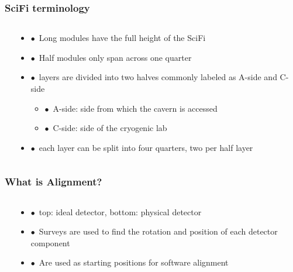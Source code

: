 \documentclass[aspectratio=1610, 12pt]{beamer}
\begin{document}
\begin{frame}\frametitle{SciFi terminology}
  \begin{columns}
    \begin{column}[c]{0.48\textwidth}
      
    \end{column}
    \begin{column}{0.48\textwidth}
      \begin{itemize}
        \item $\bullet$\, Long modules have the full height of the SciFi
        \item $\bullet$\, Half modules only span across one quarter
        \item $\bullet$\, layers are divided into two halves commonly labeled as A-side and C-side
        \begin{itemize}
          \item $\bullet$\, A-side: side from which the cavern is accessed
          \item $\bullet$\, C-side: side of the cryogenic lab
        \end{itemize}
        \item $\bullet$\, each layer can be split into four quarters, two per half layer
      \end{itemize}
    \end{column}
  \end{columns}
\end{frame}

\begin{frame}\frametitle{What is Alignment?}
  \begin{columns}
    \begin{column}[c]{0.48\textwidth}
      
    \end{column}
    \begin{column}[c]{0.48\textwidth}
      \begin{itemize}
        \item $\bullet$\, top: ideal detector, bottom: physical detector
        \item $\bullet$\, Surveys are used to find the rotation and position of each detector component
        \item $\bullet$\, Are used as starting positions for software alignment
      \end{itemize}
    \end{column}
  \end{columns}
\end{frame}
\end{document}
